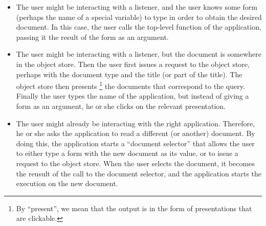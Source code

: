 \begin{itemize}
\item The user might be interacting with a listener, and the user
  knows some \commonlisp{} form (perhaps the name of a special
  variable) to type in order to obtain the desired document.  In this
  case, the user calls the top-level function of the application,
  passing it the result of the form as an argument.
\item The user might be interacting with a listener, but the document
  is somewhere in the object store.  Then the user first issues a
  request to the object store, perhaps with the document type and the
  title (or part of the title).  The object store then presents%
  \footnote{By ``present'', we mean that the output is in the form of
    \clim{} presentations that are clickable.} the documents that
  correspond to the query.  Finally the user types the name of the
  application, but instead of giving a form as an argument, he or she
  clicks on the relevant presentation.
\item The user might already be interacting with the right
  application.  Therefore, he or she asks the application to read a
  different (or another) document.  By doing this, the application
  starts a ``document selector'' that allows the user to either type a
  \commonlisp{} form with the new document as its value, or to issue a
  request to the object store.  When the user selects the document, it
  becomes the reusult of the call to the document selector, and the
  application starts the execution on the new document.
\end{itemize}
